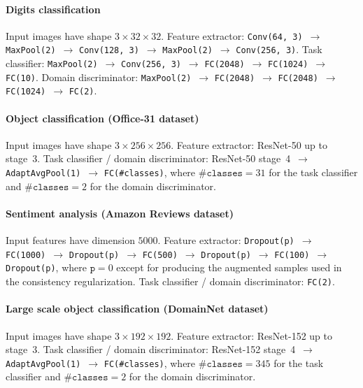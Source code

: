 \paragraph{Digits classification} Input images have shape $3 \times 32 \times 32$. Feature extractor: \texttt{Conv(64, 3)}~$\rightarrow$ \texttt{MaxPool(2)}~$\rightarrow$ \texttt{Conv(128, 3)}~$\rightarrow$ \texttt{MaxPool(2)}~$\rightarrow$ \texttt{Conv(256, 3)}. Task classifier: \texttt{MaxPool(2)}~$\rightarrow$ \texttt{Conv(256, 3)}~$\rightarrow$ \texttt{FC(2048)}~$\rightarrow$ \texttt{FC(1024)}~$\rightarrow$ \texttt{FC(10)}. Domain discriminator: \texttt{MaxPool(2)}~$\rightarrow$ \texttt{FC(2048)}~$\rightarrow$ \texttt{FC(2048)}~$\rightarrow$ \texttt{FC(1024)}~$\rightarrow$ \texttt{FC(2)}.

\paragraph{Object classification (Office-31 dataset)} Input images have shape $3 \times 256 \times 256$. Feature extractor: ResNet-50 up to stage~3. Task classifier / domain discriminator: ResNet-50 stage~4~$\rightarrow$ \texttt{AdaptAvgPool(1)}~$\rightarrow$ \texttt{FC(\#classes)}, where $\texttt{\#classes} = 31$ for the task classifier and $\texttt{\#classes} = 2$ for the domain discriminator.

\paragraph{Sentiment analysis (Amazon Reviews dataset)} Input features have dimension $5000$. Feature extractor: \texttt{Dropout(p)}~$\rightarrow$ \texttt{FC(1000)}~$\rightarrow$ \texttt{Dropout(p)}~$\rightarrow$ \texttt{FC(500)}~$\rightarrow$ \texttt{Dropout(p)}~$\rightarrow$ \texttt{FC(100)}~$\rightarrow$ \texttt{Dropout(p)}, where $\texttt{p} = 0$ except for producing the augmented samples used in the consistency regularization. Task classifier / domain discriminator: \texttt{FC(2)}.

\paragraph{Large scale object classification (DomainNet dataset)} Input images have shape $3 \times 192 \times 192$. Feature extractor: ResNet-152 up to stage~3. Task classifier / domain discriminator: ResNet-152 stage~4~$\rightarrow$ \texttt{AdaptAvgPool(1)}~$\rightarrow$ \texttt{FC(\#classes)}, where $\texttt{\#classes} = 345$ for the task classifier and $\texttt{\#classes} = 2$ for the domain discriminator.

